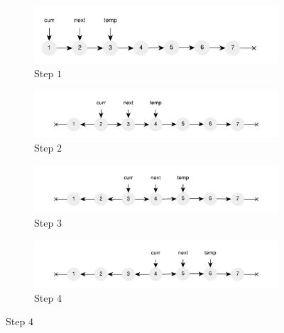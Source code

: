 \begin{figure}
	\vspace*{-0.5in}
	\centering
	\begin{subfigure}[t]{0.49\textwidth}
		\centering
		\includegraphics[width=\textwidth]{sources/list_reverse/images/list_reverse_iterative1}
		\caption[]{Step $1$}
		\label{fig:list_reverse:list_reverse_iterative1}
	 \end{subfigure}
	\hfill
	\begin{subfigure}[t]{0.49\textwidth}
		\centering
		\includegraphics[width=\textwidth]{sources/list_reverse/images/list_reverse_iterative2}
		\caption[]{Step $2$}
		\label{fig:list_reverse:list_reverse_iterative1}
	 \end{subfigure}
	 \hfill
	 \begin{subfigure}[t]{0.49\textwidth}
		\centering
		\includegraphics[width=\textwidth]{sources/list_reverse/images/list_reverse_iterative3}
		\caption[]{Step $3$}
		\label{fig:list_reverse:list_reverse_iterative1}
	 \end{subfigure}
	 \hfill
	 \begin{subfigure}[t]{0.49\textwidth}
		\centering
		\includegraphics[width=\textwidth]{sources/list_reverse/images/list_reverse_iterative4}
		\caption[]{Step $4$}
		\label{fig:list_reverse:list_reverse_iterative1}

\end{subfigure}
\end{figure}
